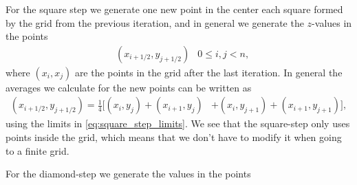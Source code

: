 For the square step we generate one new point in the center each square formed by the grid from the previous iteration, and in general we generate the $z$-values in the points
\begin{align}
    &\left(x_{i+1/2}, y_{j+1/2}\right) &0\leq i,j < n, \label{eq:square_step_limits}
\end{align}
where $(x_i,x_j)$ are the points in the grid after the last iteration. In general the averages we calculate for the new points can be written as
\begin{align}
    (x_{i+1/2}, y_{j+1/2}) 
    = \frac{1}{4}\big[
        (x_i, y_j) + (x_{i+1}, y_j)
        &+ (x_i, y_{j+1}) + (x_{i+1}, y_{j+1})
    \big],
    \label{eq:square_step}
\end{align}
using the limits in \cref{eq:square_step_limits}. We see that the square-step only uses points inside the grid, which means that we don't have to modify it when going to a finite grid.

For the diamond-step we generate the values in the points


